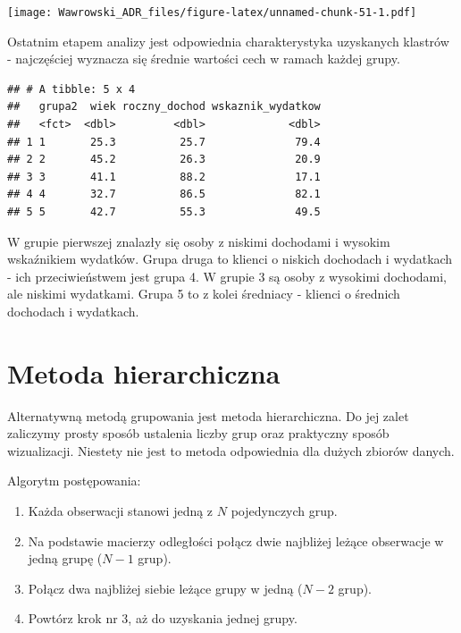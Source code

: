 \documentclass[
]{book}
\newenvironment{Shaded}{\begin{snugshade}}{\end{snugshade}}
\newcommand{\DataTypeTok}[1]{\textcolor[rgb]{0.13,0.29,0.53}{#1}}
\newcommand{\KeywordTok}[1]{\textcolor[rgb]{0.13,0.29,0.53}{\textbf{#1}}}
\newcommand{\NormalTok}[1]{#1}
\newcommand{\OperatorTok}[1]{\textcolor[rgb]{0.81,0.36,0.00}{\textbf{#1}}}
\newcommand{\StringTok}[1]{\textcolor[rgb]{0.31,0.60,0.02}{#1}}
\providecommand{\tightlist}{%
  \setlength{\itemsep}{0pt}\setlength{\parskip}{0pt}}
\begin{document}
\texttt{[image: Wawrowski\_ADR\_files/figure-latex/unnamed-chunk-51-1.pdf]}

Ostatnim etapem analizy jest odpowiednia charakterystyka uzyskanych klastrów - najczęściej wyznacza się średnie wartości cech w ramach każdej grupy.

\begin{Shaded}
\end{Shaded}

\begin{verbatim}
## # A tibble: 5 x 4
##   grupa2  wiek roczny_dochod wskaznik_wydatkow
##   <fct>  <dbl>         <dbl>             <dbl>
## 1 1       25.3          25.7              79.4
## 2 2       45.2          26.3              20.9
## 3 3       41.1          88.2              17.1
## 4 4       32.7          86.5              82.1
## 5 5       42.7          55.3              49.5
\end{verbatim}

W grupie pierwszej znalazły się osoby z niskimi dochodami i wysokim wskaźnikiem wydatków. Grupa druga to klienci o niskich dochodach i wydatkach - ich przeciwieństwem jest grupa 4. W grupie 3 są osoby z wysokimi dochodami, ale niskimi wydatkami. Grupa 5 to z kolei średniacy - klienci o średnich dochodach i wydatkach.

\hypertarget{metoda-hierarchiczna}{%
\section{Metoda hierarchiczna}\label{metoda-hierarchiczna}}

Alternatywną metodą grupowania jest metoda hierarchiczna. Do jej zalet zaliczymy prosty sposób ustalenia liczby grup oraz praktyczny sposób wizualizacji. Niestety nie jest to metoda odpowiednia dla dużych zbiorów danych.

Algorytm postępowania:

\begin{enumerate}
\def\labelenumi{\arabic{enumi}.}
\tightlist
\item
  Każda obserwacji stanowi jedną z \(N\) pojedynczych grup.
\item
  Na podstawie macierzy odległości połącz dwie najbliżej leżące obserwacje w jedną grupę (\(N-1\) grup).
\item
  Połącz dwa najbliżej siebie leżące grupy w jedną (\(N-2\) grup).
\item
  Powtórz krok nr 3, aż do uzyskania jednej grupy.
\end{enumerate}
\end{document}

